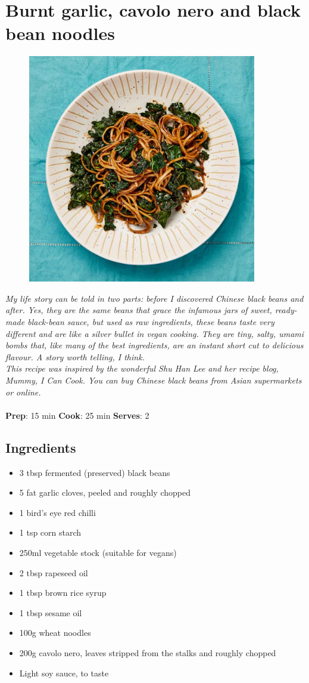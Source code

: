 \documentclass{book}
\begin{document}
\section{Burnt garlic, cavolo nero and black bean noodles}
\begin{figure}
\centering\includegraphics[width=10cm,height=10cm,keepaspectratio]{Recipe_Pictures/Burnt_garlic,_cavolo_nero_and_black_bean_noodles.png}
\end{figure}
\emph{My life story can be told in two parts: before I discovered Chinese black beans and after. Yes, they are the same beans that grace the infamous jars of sweet, ready-made black-bean sauce, but used as raw ingredients, these beans taste very different and are like a silver bullet in vegan cooking. They are tiny, salty, umami bombs that, like many of the best ingredients, are an instant short cut to delicious flavour. A story worth telling, I think.\\ 
This recipe was inspired by the wonderful Shu Han Lee and her recipe blog, Mummy, I Can Cook. You can buy Chinese black beans from Asian supermarkets or online.}\\\\ 
\textbf{Prep}: 15 min
\textbf{Cook}: 25 min
\textbf{Serves}: 2
\subsection*{Ingredients}
\begin{itemize}
\item 3 tbsp fermented (preserved) black beans
\item 5 fat garlic cloves, peeled and roughly chopped
\item 1 bird’s eye red chilli
\item 1 tsp corn starch
\item 250ml vegetable stock (suitable for vegans)
\item 2 tbsp rapeseed oil
\item 1 tbsp brown rice syrup
\item 1 tbsp sesame oil
\item 100g wheat noodles
\item 200g cavolo nero, leaves stripped from the stalks and roughly chopped
\item Light soy sauce, to taste
\end{itemize}
\end{document}
